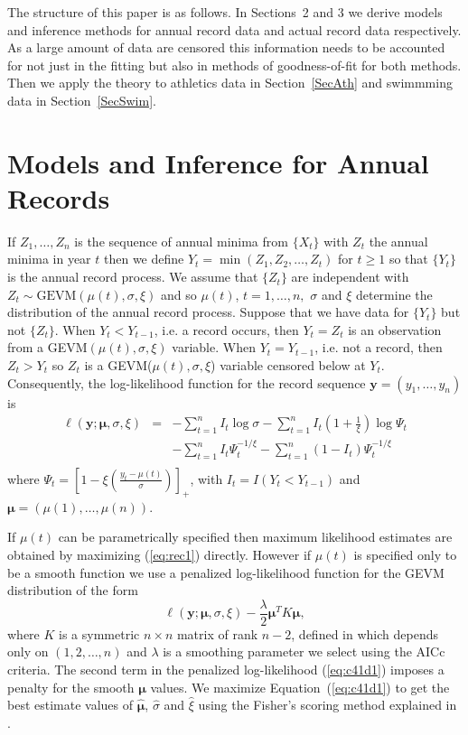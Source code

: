 \documentclass[10pt]{article}
\begin{document}
The structure of this paper is as follows. In Sections~2 and 3 we
derive models and inference methods for annual record data and
actual record data respectively. As a large amount of data are censored
this information needs to be accounted for not just in the fitting but also
in methods of goodness-of-fit for both methods. Then we apply the
theory  to athletics data in Section~\ref{SecAth} and swimmming data in
Section~\ref{SecSwim}.  


\section{Models and Inference for Annual Records}

If $Z_1, \ldots, Z_n$ is the sequence of annual minima from $\{X_t\}$
with $Z_t$ the annual minima in year $t$ then we define $Y_t = \min (
Z_1, Z_2, \ldots , Z_t)$ for $t \geq 1$ so that $\{Y_t\}$ is the annual
record process. We assume that $\{Z_t\}$ are independent with $Z_t \sim
\mbox{GEVM}(\mu(t),\sigma,\xi)$ and so $\mu(t)$, $t=1,\ldots,n,$
$\sigma$ and $\xi$ determine the distribution of the annual record
process. Suppose that we have data for $\{Y_t\}$ but not
$\{Z_t\}$. When $Y_t < Y_{t-1}$, i.e. a record occurs, then $Y_t=Z_t$
is an observation from a \mbox{GEVM}$(\mu(t),\sigma,\xi)$
variable. When $Y_t=Y_{t-1}$, i.e. not a record, then $Z_t>Y_t$ so
$Z_t$ is a \mbox{GEVM}($\mu(t),\sigma,\xi$) variable censored below at
$Y_t$. Consequently, the log-likelihood function for the record sequence 
$\pmb{y}=(y_1,\ldots,y_n)$ is
\begin{eqnarray}
\ell (\pmb{y};\pmb{\mu},\sigma,\xi) & = & - \sum^n_{t=1}I_t \log \sigma - 
\sum^n_{t=1} I_t \left(1 + \frac{1}{\xi}\right)\log \Psi_t \nonumber \\
 & &-\sum^n_{t=1}I_t \Psi_t^{-1/\xi}
-\sum^n_{t=1}(1-I_t)\Psi_t^{-1/\xi} \nonumber\\
\label{eq:rec1}
\end{eqnarray}
where $\Psi_t = \left[1-\xi\left(\frac{y_t-\mu(t)}{\sigma}\right)\right]_+ $,
with $I_t = I(Y_t < Y_{t-1})$ and
$\pmb{\mu}=\left(\mu(1),\ldots,\mu(n)\right)$.

If $\mu(t)$ can be parametrically specified then maximum likelihood
estimates are obtained by maximizing (\ref{eq:rec1}) directly. However if
$\mu(t)$ is specified only to be a smooth function we use a penalized
log-likelihood function for the GEVM distribution of the form
\begin{equation}
  \label{eq:c41d1}
\ell(\pmb{y};\pmb{\mu},\sigma,\xi)-\frac{\lambda}{2}\pmb{\mu}^TK\pmb{\mu},
\end{equation}
where $K$ is a symmetric $n
\times n$ matrix of rank $n-2$, defined in \citet{Green1994} which
depends only on $(1,2,\ldots,n)$
and  $\lambda$ is a smoothing parameter we select using the
AICc criteria. The second term in the penalized log-likelihood (\ref{eq:c41d1})
imposes a penalty for the smooth $\pmb{\mu}$ values. We maximize
Equation~(\ref{eq:c41d1}) to get the best estimate values of  $\hat{\pmb{\mu}}$,
$\hat{\sigma}$ and $\hat{\xi}$ using the Fisher's scoring method
explained in \citet{Adam2007}.  
\end{document}

